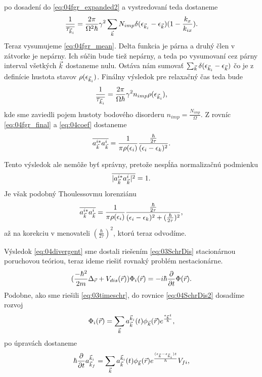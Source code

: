 po dosadení do \eqref{eq:04fgr_expanded2}  a vystredovaní teda dostaneme 
\begin{align}
\label{eq:04fgr_mean}
\frac{1}{\overline{\tau_{\vec{k}_i}}}=\frac{2\pi}{\Omega^2\hbar}\gamma^2\sum_{\vec{k}}N_{imp}\delta(\epsilon_{\vec{k}_i}-\epsilon_{\vec{k}})(1-\frac{k_x}{k_{ix}})\text{.}
\end{align}
Teraz vysumujeme \eqref{eq:04fgr_mean}. Delta funkcia je párna a druhý člen v zátvorke je nepárny. Ich súčin bude tiež nepárny, a teda po vysumovaní cez párny interval všetkých $\vec{k}$ dostaneme nulu. Ostáva nám sumovať $\sum_{\vec{k}}\delta(\epsilon_{\vec{k}_i}-\epsilon_{\vec{k}})$ čo je z definície hustota stavov $\rho(\epsilon_{\vec{k}_i})$. Finálny výsledok pre relaxačný čas teda bude
\begin{align}
\label{eq:04fgr_final}
\frac{1}{\overline{\tau_{\vec{k}_i}}}=\frac{2\pi}{\Omega\hbar}\gamma^2n_{imp}\rho(\epsilon_{\vec{k}_i}) \text{,}
\end{align}
kde sme zaviedli pojem hustoty bodového disorderu $n_{imp}=\frac{N_{imp}}{\Omega}$. Z rovníc \eqref{eq:04fgr_final} a \eqref{eq:04coef} dostaneme 
\begin{align}
\label{eq:04divergent}
\overline{a_{\vec{k}}^{i*}a_{\vec{k}}^i}=\frac{1}{\pi\rho(\epsilon_{i})}\frac{\frac{\hbar}{2\tau}}{(\epsilon_{i}-\epsilon_{k})^2}\text{.}
\end{align}

Tento výsledok ale nemôže byť správny, pretože nespĺňa normalizačnú podmienku 
\begin{align}
\overline{|a_{\vec{k}}^{i*}a_{\vec{k}}^i|^2}=1\text{.}
\end{align}
Je však podobný Thoulessovmu lorenziánu
\begin{align}
\label{eq:04lorenz}
\overline{a_{\vec{k}}^{i*}a_{\vec{k}}^i}=\frac{1}{\pi\rho(\epsilon_i)}\frac{\frac{\hbar}{2\tau}}{(\epsilon_i-\epsilon_{k})^2+(\frac{\hbar}{2\tau})^2}\text{,}
\end{align}
až na korekciu v menovateli $(\frac{\hbar}{2\tau})^2$, ktorú teraz odvodíme.

Výsledok \eqref{eq:04divergent} sme dostali riešením \eqref{eq:03SchrDis} stacionárnou poruchovou teóriou, teraz ideme riešiť rovnaký problém nestacionárne.
\begin{align}
\label{eq:04SchrDis2}
(\frac{-\hbar^2}{2m}\Delta_{\vec{r}} + V_{dis}(\vec{r}))\Phi_i(\vec{r})=-i\hbar \frac{\partial}{\partial t}\Phi(\vec{r})  \text{.}
\end{align}
Podobne, ako sme riešili \eqref{eq:03timeschr}, do rovnice \eqref{eq:04SchrDis2} dosadíme rozvoj 
\begin{align}
\Phi_i(\vec{r})=\sum_{\vec{k}}a^{\vec{k}_i}_{\vec{k}}(t)\phi_{\vec{k}}(\vec{r})e^{\frac{\epsilon_{\vec{k}}t}{\hbar}}\text{,}
\end{align}
po úpravách dostaneme
\begin{align}
\hbar \frac{\partial}{\partial t}a^{\vec{k}_i}_{\vec{k}_f}=\sum_{\vec{k}}a^{\vec{k}_i}_{\vec{k}}(t)\phi_{\vec{k}}(\vec{r})e^{\frac{(\epsilon_{\vec{k}}-\epsilon_{\vec{k}_i})t}{\hbar}}V_{fi}\text{,}
\end{align}

